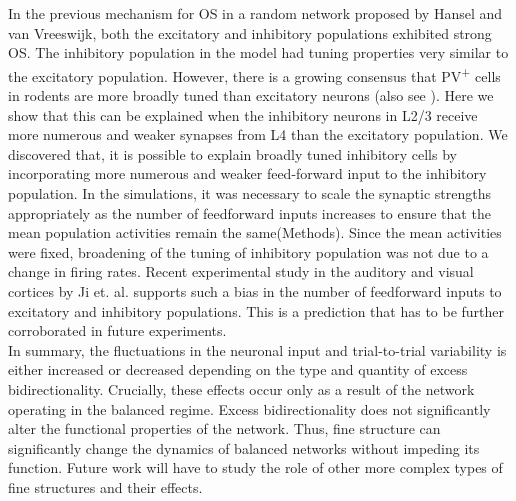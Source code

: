 In the previous mechanism for OS in a random network proposed by Hansel and van Vreeswijk, both the excitatory and inhibitory populations exhibited strong OS. The inhibitory population in the model had tuning properties very similar to the excitatory population. However, there is a growing consensus that PV\textsuperscript{+} cells in rodents are more broadly tuned than excitatory neurons \cite{niell2008highly, kerlin2010broadly, liu2009visual, sohya2007gabaergic, kameyama2010difference} (also see \cite{Runyan2010, Ma2010}). Here we show that this can be explained when the inhibitory neurons in L2/3 receive more numerous and weaker synapses from L4 than the excitatory population.  We discovered that, it is possible to explain broadly tuned inhibitory cells by incorporating more numerous and weaker feed-forward input to the inhibitory population. In the simulations, it was necessary to scale the synaptic strengths appropriately as the number of feedforward inputs increases to ensure that the mean population activities remain the same(Methods). Since the mean activities were fixed, broadening of the tuning of inhibitory population was not due to a change in firing rates. Recent experimental study in the auditory and visual cortices by Ji et. al. \cite{Ji2015} supports such a bias in the number of feedforward inputs to excitatory and inhibitory populations. This is a prediction that has to be further corroborated in future experiments. \\

In summary, the fluctuations in the neuronal input and trial-to-trial variability is either increased or decreased depending on the type and quantity of excess bidirectionality. Crucially, these effects occur only as a result of the network operating in the balanced regime. Excess bidirectionality does not significantly alter the functional properties of the network. Thus, fine structure can significantly change the dynamics of balanced networks without impeding its function. Future work will have to study the role of other more complex types of fine structures and their effects. 